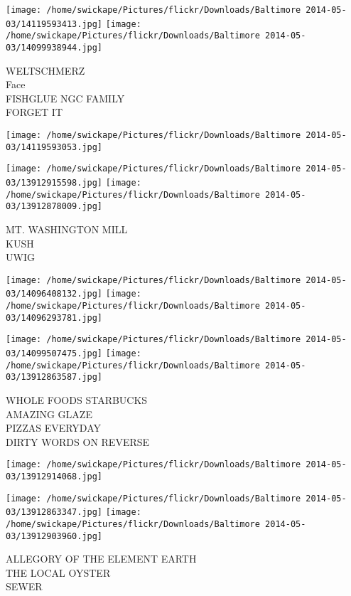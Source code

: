 \documentclass[10pt,letterpaper]{article}
\begin{document}
\texttt{[image: /home/swickape/Pictures/flickr/Downloads/Baltimore 2014-05-03/14119593413.jpg]}
\texttt{[image: /home/swickape/Pictures/flickr/Downloads/Baltimore 2014-05-03/14099938944.jpg]}

WELTSCHMERZ\\
Face\\
FISHGLUE NGC FAMILY\\
FORGET IT\\
\pagebreak

\texttt{[image: /home/swickape/Pictures/flickr/Downloads/Baltimore 2014-05-03/14119593053.jpg]}

\vspace{0.25in}
\texttt{[image: /home/swickape/Pictures/flickr/Downloads/Baltimore 2014-05-03/13912915598.jpg]}
\texttt{[image: /home/swickape/Pictures/flickr/Downloads/Baltimore 2014-05-03/13912878009.jpg]}

MT. WASHINGTON MILL\\
KUSH\\
UWIG\\
\pagebreak

\texttt{[image: /home/swickape/Pictures/flickr/Downloads/Baltimore 2014-05-03/14096408132.jpg]}
\texttt{[image: /home/swickape/Pictures/flickr/Downloads/Baltimore 2014-05-03/14096293781.jpg]}

\texttt{[image: /home/swickape/Pictures/flickr/Downloads/Baltimore 2014-05-03/14099507475.jpg]}
\texttt{[image: /home/swickape/Pictures/flickr/Downloads/Baltimore 2014-05-03/13912863587.jpg]}

WHOLE FOODS STARBUCKS\\
AMAZING GLAZE\\
PIZZAS EVERYDAY\\
DIRTY WORDS ON REVERSE\\
\pagebreak

\texttt{[image: /home/swickape/Pictures/flickr/Downloads/Baltimore 2014-05-03/13912914068.jpg]}

\vspace{0.25in}
\texttt{[image: /home/swickape/Pictures/flickr/Downloads/Baltimore 2014-05-03/13912863347.jpg]}
\texttt{[image: /home/swickape/Pictures/flickr/Downloads/Baltimore 2014-05-03/13912903960.jpg]}

ALLEGORY OF THE ELEMENT EARTH\\
THE LOCAL OYSTER\\
SEWER\\
\pagebreak
\end{document}
